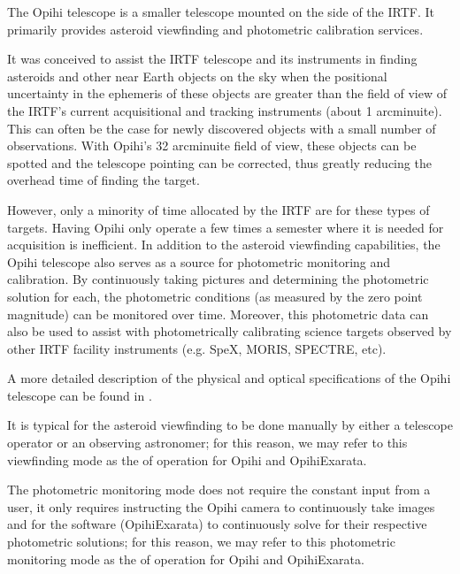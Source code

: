 \documentclass[letterpaper,11pt,english]{sphinxmanual}
\begin{document}
\sphinxAtStartPar
The Opihi telescope is a smaller telescope mounted on the side of the IRTF. It
primarily provides asteroid view\sphinxhyphen{}finding and photometric calibration services.

\sphinxAtStartPar
It was conceived to assist the IRTF telescope and its instruments in finding
asteroids and other near Earth objects on the sky when the positional
uncertainty in the ephemeris of these objects are greater than the field of
view of the IRTF’s current acquisitional and tracking instruments (about 1
arcminuite). This can often be the case for newly discovered objects with
a small number of observations. With Opihi’s 32 arcminuite field of view, these
objects can be spotted and the telescope pointing can be corrected, thus
greatly reducing the overhead time of finding the target.

\sphinxAtStartPar
However, only a minority of time allocated by the IRTF are for these types of
targets. Having Opihi only operate a few times a semester where it is needed
for acquisition is inefficient. In addition to the asteroid view\sphinxhyphen{}finding
capabilities, the Opihi telescope also serves as a source for photometric
monitoring and calibration. By continuously taking pictures and determining the
photometric solution for each, the photometric conditions (as measured by
the zero point magnitude) can be monitored over time. Moreover, this
photometric data can also be used to assist with photometrically calibrating
science targets observed by other IRTF facility instruments (e.g. SpeX, MORIS,
SPECTRE, etc).

\sphinxAtStartPar
A more detailed description of the physical and optical specifications of the
Opihi telescope can be found in {\hyperref[\detokenize{user/opihi_telescope:user-opihi-telescope}]{}}.

\sphinxAtStartPar
It is typical for the asteroid view\sphinxhyphen{}finding to be done manually by either a
telescope operator or an observing astronomer; for this reason, we may refer
to this view\sphinxhyphen{}finding mode as the {\hyperref[\detokenize{user/manual_mode:user-manual-mode}]{}} of operation for
Opihi and OpihiExarata.

\sphinxAtStartPar
The photometric monitoring mode does not require the constant
input from a user, it only requires instructing the Opihi camera to
continuously take images and for the software (OpihiExarata) to continuously
solve for their respective photometric solutions; for this reason, we may
refer to this photometric monitoring mode as the {\hyperref[\detokenize{user/automatic_mode:user-automatic-mode}]{}}
of operation for Opihi and OpihiExarata.
\end{document}
